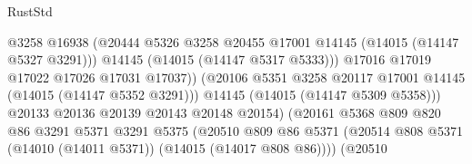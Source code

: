 \begin{lexlean}{RustStd}
\begin{coremodule}
                                              @3258
                                              @16938
                                              (@20444
                                                @5326
                                                @3258
                                                @20455
                                                @17001
                                                @14145
                                                (@14015 (@14147 @5327 @3291)))
                                              @14145
                                              (@14015 (@14147 @5317 @5333)))
                                            @17016
                                            @17019
                                            @17022
                                            @17026
                                            @17031
                                            @17037))
                                        (@20106
                                          @5351
                                          @3258
                                          @20117
                                          @17001
                                          @14145
                                          (@14015 (@14147 @5352 @3291)))
                                        @14145
                                        (@14015 (@14147 @5309 @5358)))
                                      @20133
                                      @20136
                                      @20139
                                      @20143
                                      @20148
                                      @20154)
                                    (@20161
                                      @5368
                                      @809
                                      @820
                                      @86
                                      @3291
                                      @5371
                                      @3291
                                      @5375
                                      (@20510
                                        @809
                                        @86
                                        @5371
                                        (@20514
                                          @808
                                          @5371
                                          (@14010 (@14011 @5371))
                                          (@14015 (@14017 @808 @86))))
                                      (@20510

\end{coremodule}
\end{lexlean}
